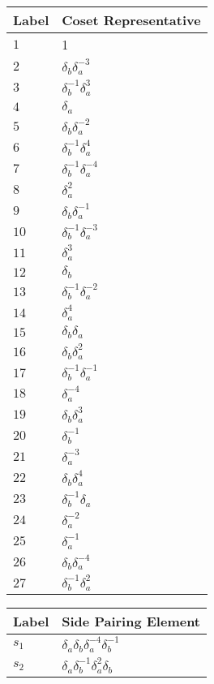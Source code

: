 \documentclass{article}
\begin{document}

\begin{center}
\begin{tabular}{ll}
\toprule
Label & Coset Representative\\
\midrule
$1$ & 1 \\
$2$ & $\delta_b^{}\delta_a^{-3}$ \\
$3$ & $\delta_b^{-1}\delta_a^{3}$ \\
$4$ & $\delta_a^{}$ \\
$5$ & $\delta_b^{}\delta_a^{-2}$ \\
$6$ & $\delta_b^{-1}\delta_a^{4}$ \\
$7$ & $\delta_b^{-1}\delta_a^{-4}$ \\
$8$ & $\delta_a^{2}$ \\
$9$ & $\delta_b^{}\delta_a^{-1}$ \\
$10$ & $\delta_b^{-1}\delta_a^{-3}$ \\
$11$ & $\delta_a^{3}$ \\
$12$ & $\delta_b^{}$ \\
$13$ & $\delta_b^{-1}\delta_a^{-2}$ \\
$14$ & $\delta_a^{4}$ \\
$15$ & $\delta_b^{}\delta_a^{}$ \\
$16$ & $\delta_b^{}\delta_a^{2}$ \\
$17$ & $\delta_b^{-1}\delta_a^{-1}$ \\
$18$ & $\delta_a^{-4}$ \\
$19$ & $\delta_b^{}\delta_a^{3}$ \\
$20$ & $\delta_b^{-1}$ \\
$21$ & $\delta_a^{-3}$ \\
$22$ & $\delta_b^{}\delta_a^{4}$ \\
$23$ & $\delta_b^{-1}\delta_a^{}$ \\
$24$ & $\delta_a^{-2}$ \\
$25$ & $\delta_a^{-1}$ \\
$26$ & $\delta_b^{}\delta_a^{-4}$ \\
$27$ & $\delta_b^{-1}\delta_a^{2}$ \\
\bottomrule
\end{tabular}
\hfill
\begin{tabular}{ll}
\toprule
Label & Side Pairing Element\\
\midrule
$s_{1}$ & $\delta_a^{}\delta_b^{}\delta_a^{-4}\delta_b^{-1}$ \\
$s_{2}$ & $\delta_a^{}\delta_b^{-1}\delta_a^{2}\delta_b^{}$ \\

\end{tabular}
\end{center}
\end{document}
